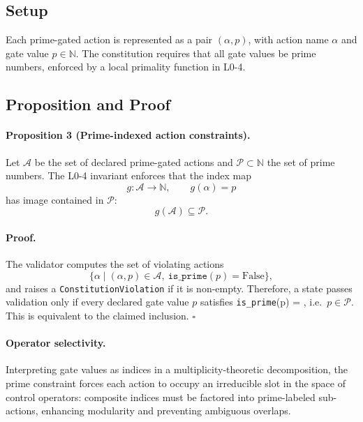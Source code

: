\documentclass[11pt]{article}
\begin{document}
\subsection{Setup}

Each prime-gated action is represented as a pair \((\alpha, p)\), with action name \(\alpha\) and gate value \(p\in\mathbb{N}\). The constitution requires that all gate values be prime numbers, enforced by a local primality function in L0-4.\cite{cite:40,cite:42}

\subsection{Proposition and Proof}

\paragraph{Proposition 3 (Prime-indexed action constraints).}
Let \(\mathcal{A}\) be the set of declared prime-gated actions and \(\mathcal{P}\subset\mathbb{N}\) the set of prime numbers. The L0-4 invariant enforces that the index map
\[
  g : \mathcal{A} \rightarrow \mathbb{N},\qquad g(\alpha) = p
\]
has image contained in \(\mathcal{P}\):
\[
  g(\mathcal{A}) \subseteq \mathcal{P}.
\]

\paragraph{Proof.}
The validator computes the set of violating actions
\[
  \{\alpha \mid (\alpha, p) \in \mathcal{A},\ \texttt{is\_prime}(p) = \mathrm{False}\},
\]
and raises a \texttt{ConstitutionViolation} if it is non-empty.\cite{cite:40,cite:42} 
Therefore, a state passes validation only if every declared gate value \(p\) satisfies \texttt{is\_prime}(p) = , i.e.\ \(p\in\mathcal{P}\). This is equivalent to the claimed inclusion. \(\square\)

\paragraph{Operator selectivity.}
Interpreting gate values as indices in a multiplicity-theoretic decomposition, the prime constraint forces each action to occupy an irreducible slot in the space of control operators: composite indices must be factored into prime-labeled sub-actions, enhancing modularity and preventing ambiguous overlaps.

\end{document}
